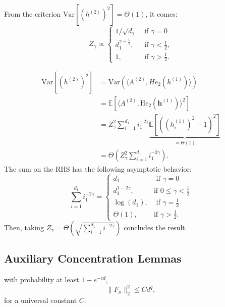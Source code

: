 \documentclass[]{article}
\makeatletter
\numberwithin{equation}{section}
\theoremstyle{definition}
\renewenvironment{proof}[1][\proofname]{\par
  \pushQED{\qed}%
  \normalfont \topsep6\p@\@plus6\p@\relax
  \trivlist
  \item[\hskip\labelsep\textbf{#1.}]\ignorespaces
}{%
  \popQED\endtrivlist\@endpefalse
}
\newcommand{\EE}{\mathbb{E}}
\newcommand{\He}{\mathord{\mathrm{He}}}
\newcommand{\para}[1]{\left(#1\right)}
\renewcommand{\vec}[1]{\bm{#1}}
\newcommand{\bh}{\vec{h}}
\makeatother
\begin{document}
\begin{lemma}
From the criterion $\mathrm{Var}[(h^{(2)})^2] = \Theta(1)$, it comes:
\begin{equation}
    Z_\gamma \propto \begin{cases}
        1/\sqrt{d_1} & \text{ if } \gamma = 0\\ 
        d_1^{\gamma-\frac{1}{2}}, & \text{ if } \gamma < \frac{1}{2}, \\ 
        1, & \text{ if } \gamma > \frac{1}{2}. 
    \end{cases}
    \label{eq:C_gamma}
\end{equation}
\label{lemma:normalization_C_gamma}
\end{lemma}
\begin{proof}
\begin{align}
    \mathrm{Var}\left[(h^{(2)})^2\right]  & = \mathrm{Var}\left( \langle A^{(2)}, He_2(h^{(1)}) \rangle \right )\\ 
    & =\EE\left[ \langle A^{(2)}, \He_2(\bh^{(1)})\rangle^2 \right] \\
    &= Z_\gamma^2 \sum_{i=1}^{d_1} i_1^{-2\gamma} \underbrace{\EE\left[ \para{\para{h^{(1)}_i}^2 -1}^2\right]}_{=\Theta(1)} \\
    &=  \Theta \left ( Z_\gamma^2 \sum_{i=1}^{d_1} i_1^{-2\gamma} \right ). 
\end{align}
The sum on the RHS has the following asymptotic behavior: 
\begin{equation}
    \sum_{i=1}^{d_1} i_1^{-2\gamma} = \begin{cases}
        d_1 & \text{ if } \gamma = 0 \\ 
        d_1^{1-2\gamma}, &\text{if } 0 \leq \gamma < \frac{1}{2} \\
        \log(d_1), & \text{ if } \gamma = \frac{1}{2} \\
        \Theta(1),  & \text{if } \gamma > \frac{1}{2}. 
    \end{cases}
\end{equation} 
Then, taking $Z_\gamma = \Theta(\sqrt{\sum_{i=1}^{d_1} i^{-2\gamma}})$ concludes the result. 
\end{proof}

\subsection{Auxiliary Concentration Lemmas}
\begin{lemma}
    with probability at least $1 - e^{-cd}$, 
    \begin{equation}
        \| F_\mu \|^{2}_2 \leq C d^{q},
    \end{equation}
    for a universal constant $C$. 
    \label{lemma:bound_norm_hermite}
\end{lemma}
\end{document}
